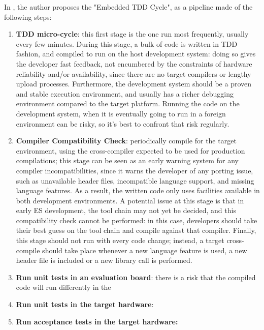 \noindent In \cite{TDDEC}, the author proposes the "Embedded TDD Cycle", as a pipeline made of the following steps:
\begin{enumerate}
    \item \textbf{TDD micro-cycle}: this first stage is the one run most frequently, usually every few minutes. During this stage, a bulk of code is written in TDD fashion, and compiled to run on the host development system: doing so gives the developer fast feedback, not encumbered by the constraints of hardware reliability and/or availability, since there are no target compilers or lengthy upload processes. Furthermore, the development system should be a proven and stable execution environment, and usually has a richer debugging environment compared to the target platform. 
    Running the code on the development system, when it is eventually going to run in a foreign environment can be risky, so it's best to confront that risk regularly.
    \item \textbf{Compiler Compatibility Check}: periodically compile for the target environment, using the cross-compiler expected to be used for production compilations; this stage can be seen as an early warning system for any compiler incompatibilities, since it warns the developer of any porting issue, such as unavailable header files, incompatible language support, and missing language features. As a result, the written code only uses facilities available in both development environments.
    A potential issue at this stage is that in early ES development, the tool chain may not yet be decided, and this compatibility check cannot be performed: in this case, developers should take their best guess on the tool chain and compile against that compiler.
    Finally, this stage should not run with every code change; instead, a target cross-compile should take place whenever a new language feature is used, a new header file is included or a new library call is performed.
    \item \textbf{Run unit tests in an evaluation board}: there is a risk that the compiled code will run differently in the 
    \item \textbf{Run unit tests in the target hardware}:
    \item \textbf{Run acceptance tests in the target hardware:}
\end{enumerate}